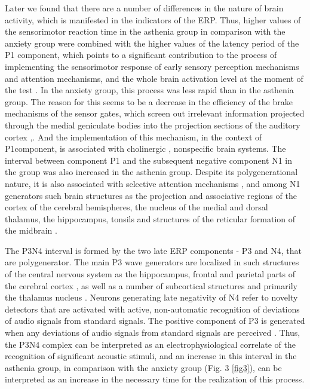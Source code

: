 \documentclass[twocolumn]{article}
\begin{document}
\par Later we found that there are a number of differences in the nature of brain activity, which is manifested in the indicators of the ERP. Thus, higher values of the sensorimotor reaction time in the asthenia group in comparison with the anxiety group were combined with the higher values of the latency period of the P1 component, which points to a significant contribution to the process of implementing the sensorimotor response of early sensory perception mechanisms and attention mechanisms, and the whole brain activation level at the moment of the test \cite{bib17}. In the anxiety group, this process was less rapid than in the asthenia group. The reason for this seems to be a decrease in the efficiency of the brake mechanisms of the sensor gates, which screen out irrelevant information projected through the medial geniculate bodies into the projection sections of the auditory cortex \cite{bib18},\cite{bib19}. And the implementation of this mechanism, in the context of P1component, is associated with cholinergic \cite{bib20},\cite{bib21} nonspecific brain systems. The interval between component P1 and the subsequent negative component N1 in the group was also increased in the asthenia group. Despite its polygenerational nature, \cite{bib22} it is also associated with selective attention mechanisms \cite{bib23}, and among N1 generators such brain structures as the projection and associative regions of the cortex of the cerebral hemispheres, the nucleus of the medial and dorsal thalamus, the hippocampus, tonsils and structures of the reticular formation of the midbrain \cite{bib24}. 
\par The P3N4 interval is formed by the two late ERP components - P3 and N4, that are polygenerator. The main P3 wave generators are localized in such structures of the central nervous system as the hippocampus, frontal and parietal parts of the cerebral cortex \cite{bib25}, as well as a number of subcortical structures and primarily the thalamus nucleus \cite{bib26}. Neurons generating late negativity of N4 refer to novelty detectors that are activated with active, non-automatic recognition of deviations of audio signals from standard signals. The positive component of P3 is generated when any deviations of audio signals from standard signals are perceived \cite{bib27}. Thus, the P3N4 complex can be interpreted as an electrophysiological correlate of the recognition of significant acoustic stimuli, and an increase in this interval in the asthenia group, in comparison with the anxiety group (Fig. 3 \ref{fig3}), can be interpreted as an increase in the necessary time for the realization of this process. 
\end{document}
